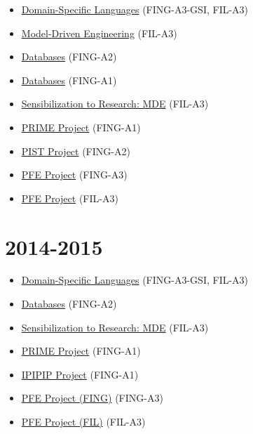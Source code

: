 \begin{itemize}
\tightlist
\item
  \href{https://campusneo.mines-nantes.fr/campus/course/view.php?id=1571}{Domain-Specific
  Languages} (FING-A3-GSI, FIL-A3)
\item
  \href{https://campusneo.mines-nantes.fr/campus/course/view.php?id=1558}{Model-Driven
  Engineering} (FIL-A3)
\item
  \href{https://campusneo.mines-nantes.fr/campus/course/view.php?id=1545}{Databases}
  (FING-A2)
\item
  \href{https://campusneo.mines-nantes.fr/campus/course/view.php?id=1546}{Databases}
  (FING-A1)
\item
  \href{https://campusneo.mines-nantes.fr/campus/course/view.php?id=1532}{Sensibilization
  to Research: MDE} (FIL-A3)
\item
  \href{https://campusneo.mines-nantes.fr/campus/course/view.php?id=621}{PRIME
  Project} (FING-A1)
\item
  \href{https://campusneo.mines-nantes.fr/campus/course/view.php?id=115}{PIST
  Project} (FING-A2)
\item
  \href{https://campusneo.mines-nantes.fr/campus/course/view.php?id=1540}{PFE
  Project} (FING-A3)
\item
  \href{https://campusneo.mines-nantes.fr/campus/course/view.php?id=1344}{PFE
  Project} (FIL-A3)
\end{itemize}

\hypertarget{section-8}{%
\section{2014-2015}\label{section-8}}

\begin{itemize}
\tightlist
\item
  \href{https://campusneo.mines-nantes.fr/campus/course/view.php?id=1472}{Domain-Specific
  Languages} (FING-A3-GSI, FIL-A3)
\item
  \href{https://campusneo.mines-nantes.fr/campus/course/view.php?id=1471}{Databases}
  (FING-A2)
\item
  \href{https://campusneo.mines-nantes.fr/campus/course/view.php?id=1532}{Sensibilization
  to Research: MDE} (FIL-A3)
\item
  \href{https://campusneo.mines-nantes.fr/campus/course/view.php?id=621}{PRIME
  Project} (FING-A1)
\item
  \href{https://campusneo.mines-nantes.fr/campus/course/view.php?id=391}{IPIPIP
  Project} (FING-A1)
\item
  \href{https://campusneo.mines-nantes.fr/campus/course/view.php?id=1486}{PFE
  Project (FING)} (FING-A3)
\item
  \href{https://campusneo.mines-nantes.fr/campus/course/view.php?id=1344}{PFE
  Project (FIL)} (FIL-A3)
\end{itemize}

